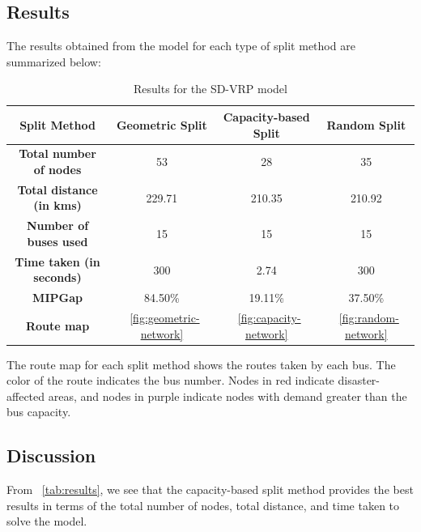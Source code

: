 \documentclass[12pt]{article}
\begin{document}
\subsection{Results}
The results obtained from the model for each type of split method are summarized below:

\begin{table}[htbp]
    \centering
    \begin{tabular}{|c|c|c|c|}
        \hline
        \textbf{Split Method}            & \textbf{Geometric Split}         & \textbf{Capacity-based Split}   & \textbf{Random Split}         \\
        \hline
        \textbf{Total number of nodes}   & 53                               & 28                              & 35                            \\
        \hline
        \textbf{Total distance (in kms)} & 229.71                           & 210.35                          & 210.92                        \\
        \hline
        \textbf{Number of buses used}    & 15                               & 15                              & 15                            \\
        \hline
        \textbf{Time taken (in seconds)} & 300                              & 2.74                            & 300                           \\
        \hline
        \textbf{MIPGap}                  & 84.50\%                          & 19.11\%                         & 37.50\%                       \\
        \hline
        \textbf{Route map}               & ~\autoref{fig:geometric-network} & ~\autoref{fig:capacity-network} & ~\autoref{fig:random-network} \\
        \hline
    \end{tabular}
    \caption{Results for the SD-VRP model}
    \label{tab:results}
\end{table}

The route map for each split method shows the routes taken by each bus.
The color of the route indicates the bus number.
Nodes in red indicate disaster-affected areas,
and nodes in purple indicate nodes with demand greater than the bus capacity.

\subsection{Discussion}
From ~\autoref{tab:results}, we see that
the capacity-based split method provides the best results in terms of the total number of nodes, total distance, and time taken to solve the model.
\end{document}

